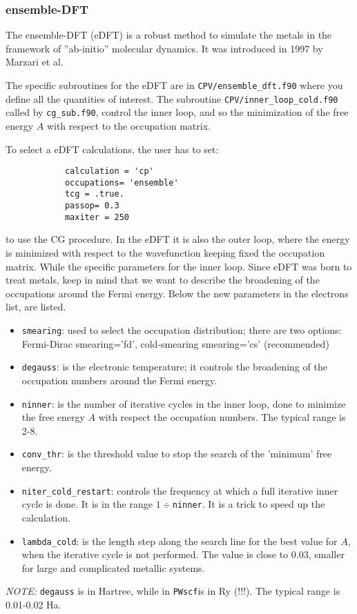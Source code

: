 \documentclass[12pt,a4paper]{article}
\def\PWscf{\texttt{PWscf}}
\begin{document}

\subsubsection{ ensemble-DFT }

The ensemble-DFT (eDFT) is a robust method to simulate the metals in the 
framework of ''ab-initio'' molecular dynamics. It was introduced in 1997 
by Marzari et al.

The specific subroutines for the eDFT are in 
\texttt{CPV/ensemble\_dft.f90} where you 
define all the quantities of interest. The subroutine 
\texttt{CPV/inner\_loop\_cold.f90}
called by \texttt{cg\_sub.f90}, control the inner loop, and so the minimization of 
the free energy $A$ with respect to the occupation matrix.

To select a eDFT calculations, the user has to set:
\begin{verbatim}
            calculation = 'cp'
            occupations= 'ensemble' 
            tcg = .true.
            passop= 0.3
            maxiter = 250
\end{verbatim}
to use the CG procedure. In the eDFT it is also the outer loop, where the
energy is minimized with respect to the wavefunction keeping fixed the 
occupation matrix. While the specific parameters for the inner loop.
Since eDFT was born to treat metals, keep in mind that we want to describe 
the broadening of the occupations around the Fermi energy.
Below the new parameters in the electrons list, are listed.
\begin{itemize}
\item \texttt{smearing}: used to select the occupation distribution;
there are two options: Fermi-Dirac smearing='fd', cold-smearing
smearing='cs' (recommended) 
\item \texttt{degauss}: is the electronic temperature; it controls the broadening
of the occupation numbers around the Fermi energy. 
\item \texttt{ninner}: is the number of iterative cycles in the inner loop, 
done to minimize the free energy $A$ with respect the occupation numbers.
The typical range is 2-8.
\item \texttt{conv\_thr}: is the threshold value to stop the search of the 'minimum' 
free energy.
\item \texttt{niter\_cold\_restart}: controls the frequency at which a full iterative
inner cycle is done. It is in the range $1\div$\texttt{ninner}. It is a trick to speed up 
the calculation.
\item \texttt{lambda\_cold}: is the length step along the search line for the best 
value for $A$, when the iterative cycle is not performed. The value is close 
to 0.03, smaller for large and complicated metallic systems.
\end{itemize}
{\em NOTE:} \texttt{degauss} is in Hartree, while in \PWscf is in Ry (!!!). 
The typical range is 0.01-0.02 Ha.
\end{document}
